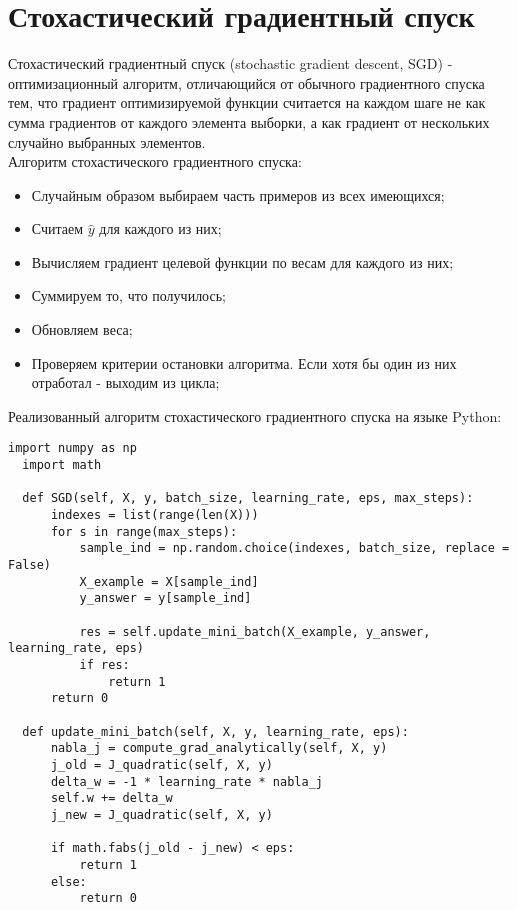 
\section{Стохастический градиентный спуск}

\indent \indent Стохастический градиентный спуск (stochastic gradient descent, SGD) - оптимизационный алгоритм, отличающийся от обычного градиентного спуска тем, что градиент оптимизируемой функции считается на каждом шаге не как сумма градиентов от каждого элемента выборки, а как градиент от нескольких случайно выбранных элементов. \\

Алгоритм стохастического градиентного спуска:
\begin{itemize}
  \item Случайным образом выбираем часть примеров из всех имеющихся;
  \item Считаем $\hat{y}$ для каждого из них;
  \item Вычисляем градиент целевой функции по весам для каждого из них;
  \item Суммируем то, что получилось;
  \item Обновляем веса;
  \item Проверяем критерии остановки алгоритма. Если хотя бы один из них отработал - выходим из цикла;
\end{itemize}

Реализованный алгоритм стохастического градиентного спуска на языке Python:

\begin{lstlisting}[caption={Стохастический градиентный спуск}]
  import numpy as np
  import math
  
  def SGD(self, X, y, batch_size, learning_rate, eps, max_steps):
      indexes = list(range(len(X)))
      for s in range(max_steps):
          sample_ind = np.random.choice(indexes, batch_size, replace = False)
          X_example = X[sample_ind]
          y_answer = y[sample_ind]
              
          res = self.update_mini_batch(X_example, y_answer, learning_rate, eps) 
          if res: 
              return 1 
      return 0
  
  def update_mini_batch(self, X, y, learning_rate, eps):
      nabla_j = compute_grad_analytically(self, X, y)
      j_old = J_quadratic(self, X, y)
      delta_w = -1 * learning_rate * nabla_j
      self.w += delta_w
      j_new = J_quadratic(self, X, y)
      
      if math.fabs(j_old - j_new) < eps:
          return 1
      else:
          return 0
\end{lstlisting}